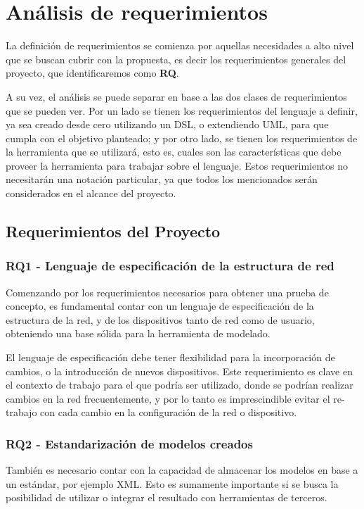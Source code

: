 \chapter{Análisis de requerimientos} \label{Analisis de Requerimientos}

La definición de requerimientos se comienza por aquellas necesidades a alto nivel que se buscan cubrir con la propuesta, es decir los requerimientos generales del proyecto, que identificaremos como \textbf{RQ}.

A su vez, el análisis se puede separar en base a las dos clases de requerimientos que se pueden ver. Por un lado se tienen los requerimientos del lenguaje a definir, ya sea creado desde cero utilizando un DSL, o extendiendo UML, para que cumpla con el objetivo planteado; y por otro lado, se tienen los requerimientos de la herramienta que se utilizará, esto es, cuales son las características que debe proveer la herramienta para trabajar sobre el lenguaje.
Estos requerimientos no necesitarán una notación particular, ya que todos los mencionados serán considerados en el alcance del proyecto.

\section{Requerimientos del Proyecto}
\subsection{RQ1 - Lenguaje de especificación de la estructura de red} \label{RQ1}
Comenzando por los requerimientos necesarios para obtener una prueba de concepto, es fundamental contar con un lenguaje de especificación de la estructura de la red, y de los dispositivos tanto de red como de usuario, obteniendo una base sólida para la herramienta de modelado.

El lenguaje de especificación debe tener flexibilidad para la incorporación de cambios, o la introducción de nuevos dispositivos. Este requerimiento es clave en el contexto de trabajo para el que podría ser utilizado, donde se podrían realizar cambios en la red frecuentemente, y por lo tanto es imprescindible evitar el re-trabajo con cada cambio en la configuración de la red o dispositivo.

\subsection{RQ2 - Estandarización de modelos creados} \label{RQ2}
También es necesario contar con la capacidad de almacenar los modelos en base a un estándar, por ejemplo XML. Esto es sumamente importante si se busca la posibilidad de utilizar o integrar el resultado con herramientas de terceros.

